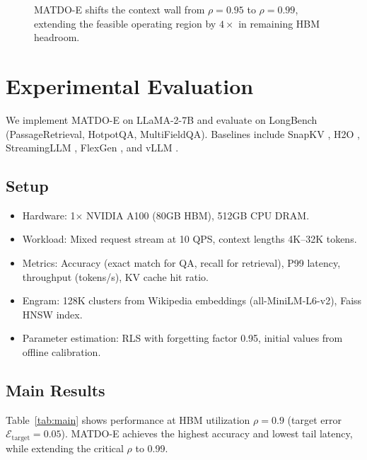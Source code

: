 \documentclass[11pt,a4paper]{article}
\theoremstyle{plain}
\theoremstyle{definition}
\begin{document}
\begin{figure}[t]
\centering
{}
\caption{MATDO-E shifts the context wall from $\rho=0.95$ to $\rho=0.99$, extending the feasible operating region by $4\times$ in remaining HBM headroom.}
\label{fig:postpone}
\end{figure}

\section{Experimental Evaluation}
\label{sec:experiments}
We implement MATDO-E on LLaMA-2-7B and evaluate on LongBench (PassageRetrieval, HotpotQA, MultiFieldQA). Baselines include SnapKV \cite{snapkv}, H2O \cite{h2o}, StreamingLLM \cite{streamingllm}, FlexGen \cite{flexgen}, and vLLM \cite{vllm}.

\subsection{Setup}
\begin{itemize}
    \item Hardware: 1$\times$ NVIDIA A100 (80GB HBM), 512GB CPU DRAM.
    \item Workload: Mixed request stream at 10 QPS, context lengths 4K--32K tokens.
    \item Metrics: Accuracy (exact match for QA, recall for retrieval), P99 latency, throughput (tokens/s), KV cache hit ratio.
    \item Engram: 128K clusters from Wikipedia embeddings (all-MiniLM-L6-v2), Faiss HNSW index.
    \item Parameter estimation: RLS with forgetting factor 0.95, initial values from offline calibration.
\end{itemize}

\subsection{Main Results}
Table~\ref{tab:main} shows performance at HBM utilization $\rho=0.9$ (target error $\mathcal{E}_{\text{target}}=0.05$). MATDO-E achieves the highest accuracy and lowest tail latency, while extending the critical $\rho$ to 0.99.
\end{document}
